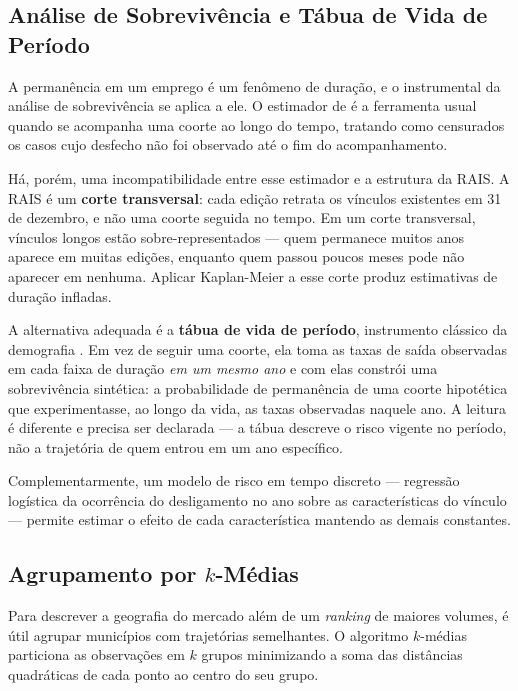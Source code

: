 \subsection{Análise de Sobrevivência e Tábua de Vida de Período}
\label{subsec:sobrevivencia}

A permanência em um emprego é um fenômeno de duração, e o instrumental da análise de sobrevivência se aplica a ele. O estimador de  é a ferramenta usual quando se acompanha uma coorte ao longo do tempo, tratando como censurados os casos cujo desfecho não foi observado até o fim do acompanhamento.

Há, porém, uma incompatibilidade entre esse estimador e a estrutura da RAIS. A RAIS é um \textbf{corte transversal}: cada edição retrata os vínculos existentes em 31 de dezembro, e não uma coorte seguida no tempo. Em um corte transversal, vínculos longos estão sobre-representados --- quem permanece muitos anos aparece em muitas edições, enquanto quem passou poucos meses pode não aparecer em nenhuma. Aplicar Kaplan-Meier a esse corte produz estimativas de duração infladas.

A alternativa adequada é a \textbf{tábua de vida de período}, instrumento clássico da demografia \cite{Preston2001}. Em vez de seguir uma coorte, ela toma as taxas de saída observadas em cada faixa de duração \textit{em um mesmo ano} e com elas constrói uma sobrevivência sintética: a probabilidade de permanência de uma coorte hipotética que experimentasse, ao longo da vida, as taxas observadas naquele ano. A leitura é diferente e precisa ser declarada --- a tábua descreve o risco vigente no período, não a trajetória de quem entrou em um ano específico.

Complementarmente, um modelo de risco em tempo discreto --- regressão logística da ocorrência do desligamento no ano sobre as características do vínculo --- permite estimar o efeito de cada característica mantendo as demais constantes.

\subsection{Agrupamento por $k$-Médias}
\label{subsec:clusters}

Para descrever a geografia do mercado além de um \textit{ranking} de maiores volumes, é útil agrupar municípios com trajetórias semelhantes. O algoritmo $k$-médias \cite{MacQueen1967} particiona as observações em $k$ grupos minimizando a soma das distâncias quadráticas de cada ponto ao centro do seu grupo.

